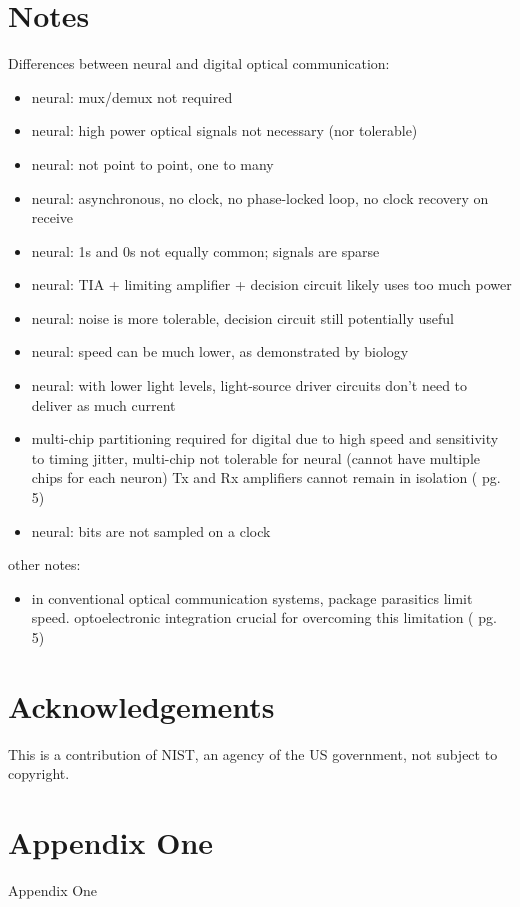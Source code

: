 \documentclass[twocolumn]{article}
\begin{document}
\section{Notes}
Differences between neural and digital optical communication:
\begin{itemize}
\item neural: mux/demux not required
\item neural: high power optical signals not necessary (nor tolerable)
\item neural: not point to point, one to many
\item neural: asynchronous, no clock, no phase-locked loop, no clock recovery on receive
\item neural: 1s and 0s not equally common; signals are sparse
\item neural: TIA + limiting amplifier + decision circuit likely uses too much power
\item neural: noise is more tolerable, decision circuit still potentially useful
\item neural: speed can be much lower, as demonstrated by biology
\item neural: with lower light levels, light-source driver circuits don't need to deliver as much current
\item multi-chip partitioning required for digital due to high speed and sensitivity to timing jitter, multi-chip not tolerable for neural (cannot have multiple chips for each neuron) Tx and Rx amplifiers cannot remain in isolation (\cite{ra2012} pg. 5)
\item neural: bits are not sampled on a clock
\end{itemize}

other notes:
\begin{itemize}
\item in conventional optical communication systems, package parasitics limit speed. optoelectronic integration crucial for overcoming this limitation (\cite{ra2012} pg. 5)

\end{itemize}

\section{Acknowledgements}

\vspace{1em}
\noindent This is a contribution of NIST, an agency of the US government, not subject to copyright.

\appendix

\section{\label{apx:one}Appendix One}
Appendix One

	

\end{document}
